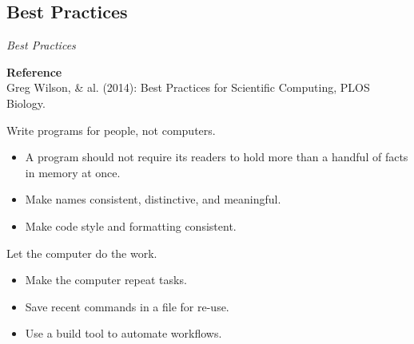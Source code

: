 
\begin{frame}\section{Best Practices}
\begin{center}\textit{\huge Best Practices}\end{center}
\end{frame}


\begin{frame}\begin{center}
	\textbf{Reference}\\\vspace{0.3cm}
    Greg Wilson, \& al. (2014): Best Practices for Scientific Computing, PLOS Biology.\nocite{Wilson.2014}
    \end{center}
\end{frame}

\begin{frame}
\begin{cenumerate*}
\item Write programs for people, not computers.\vspace{0.3cm}
	\begin{itemize}
	\item A program should not require its readers to hold more than a handful of facts in memory at once.\vspace{0.2cm}
	\item Make names consistent, distinctive, and meaningful.\vspace{0.2cm}
	\item Make code style and formatting consistent.
	\end{itemize}
\end{cenumerate*}
\end{frame}


\begin{frame}
\begin{cenumerate}
\item Let the computer do the work. \vspace{0.3cm}
	\begin{itemize}
	\item Make the computer repeat tasks.\vspace{0.2cm}
	\item Save recent commands in a file for re-use.\vspace{0.2cm}
	\item Use a build tool to automate workflows.
	\end{itemize}
\end{cenumerate}
\end{frame}

